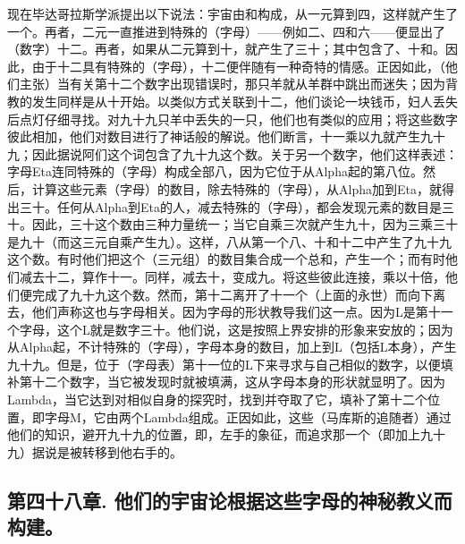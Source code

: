 现在毕达哥拉斯学派提出以下说法：宇宙由和构成，从一元算到四，这样就产生了一个。再者，二元一直推进到特殊的（字母）——例如二、四和六——便显出了（数字）十二。再者，如果从二元算到十，就产生了三十；其中包含了、十和。因此，由于十二具有特殊的（字母），十二便伴随有一种奇特的情感。正因如此，（他们主张）当有关第十二个数字出现错误时，那只羊就从羊群中跳出而迷失；因为背教的发生同样是从十开始。以类似方式关联到十二，他们谈论一块钱币，妇人丢失后点灯仔细寻找。对九十九只羊中丢失的一只，他们也有类似的应用；将这些数字彼此相加，他们对数目进行了神话般的解说。他们断言，十一乘以九就产生九十九；因此据说阿们这个词包含了九十九这个数。关于另一个数字，他们这样表述：字母Eta连同特殊的（字母）构成全部八，因为它位于从Alpha起的第八位。然后，计算这些元素（字母）的数目，除去特殊的（字母），从Alpha加到Eta，就得出三十。任何从Alpha到Eta的人，减去特殊的（字母），都会发现元素的数目是三十。因此，三十这个数由三种力量统一；当它自乘三次就产生九十，因为三乘三十是九十（而这三元自乘产生九）。这样，八从第一个八、十和十二中产生了九十九这个数。有时他们把这个（三元组）的数目集合成一个总和，产生一个；而有时他们减去十二，算作十一。同样，减去十，变成九。将这些彼此连接，乘以十倍，他们便完成了九十九这个数。然而，第十二离开了十一个（上面的永世）而向下离去，他们声称这也与字母相关。因为字母的形状教导我们这一点。因为L是第十一个字母，这个L就是数字三十。他们说，这是按照上界安排的形象来安放的；因为从Alpha起，不计特殊的（字母），字母本身的数目，加上到L（包括L本身），产生九十九。但是，位于（字母表）第十一位的L下来寻求与自己相似的数字，以便填补第十二个数字，当它被发现时就被填满，这从字母本身的形状就显明了。因为Lambda，当它达到对相似自身的探究时，找到并夺取了它，填补了第十二个位置，即字母M，它由两个Lambda组成。正因如此，这些（马库斯的追随者）通过他们的知识，避开九十九的位置，即，左手的象征，而追求那一个（即加上九十九）据说是被转移到他右手的。\par


\subsection{第四十八章. 他们的宇宙论根据这些字母的神秘教义而构建。}

